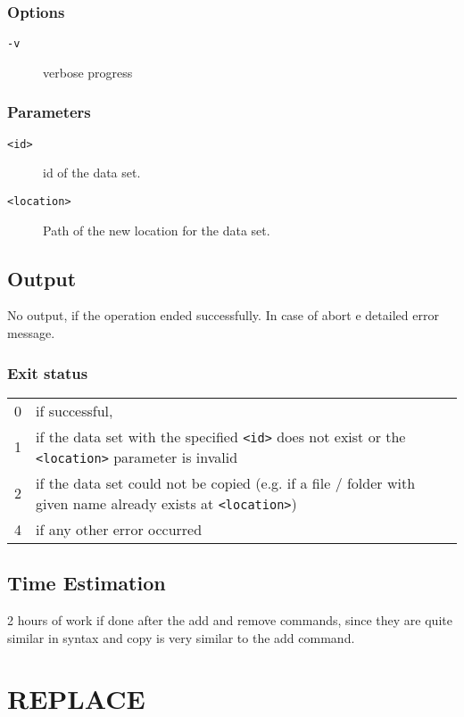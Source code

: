 \documentclass{article} %
\begin{document}
		\noindent
		\subsubsection*{Options}
		\begin{description}
			\item[\texttt{-v}] verbose progress
		\end{description}
		
		\subsubsection*{Parameters}
		\begin{description}
			\item[\texttt{<id>}]  id of the data set.
			\item[\texttt{<location>}] Path of the new location for the data set.
		\end{description}
		\subsection*{Output}
		No output, if the operation ended successfully. In case of abort e detailed error message.
		\subsubsection*{Exit status}
		\begin{tabular}{ll}
			0 &  if successful,\\ 
			1 &  if the data set with the specified \texttt{<id>} does not exist or the \texttt{<location>} parameter is invalid\\
			2 &  if the data set could not be copied (e.g. if  a file / folder with given name already exists at \texttt{<location>})\\
			4 &  if any other error occurred\\
		\end{tabular}
		
		\subsection*{Time Estimation}
		2 hours of work if done after the add and remove commands, since they are quite similar in syntax and copy is very similar to the add command.\\
		\noindent
		
		\newpage
		\section*{REPLACE}
\end{document}
